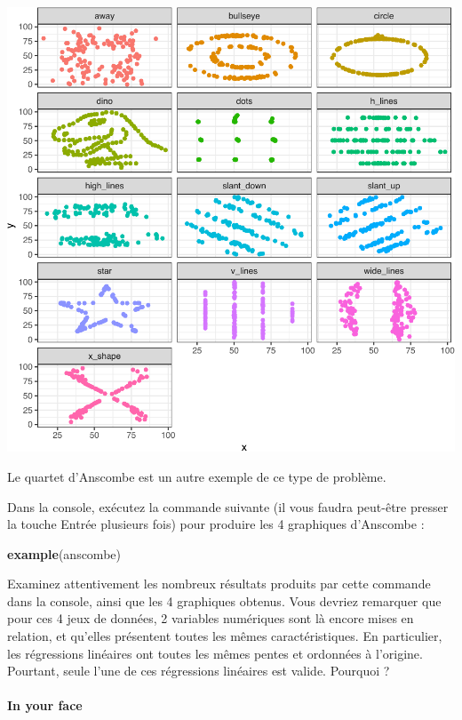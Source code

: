 \documentclass[
  a4paper,
]{article}
\newenvironment{Shaded}{\begin{snugshade}}{\end{snugshade}}
\newcommand{\KeywordTok}[1]{\textcolor[rgb]{0.12,0.11,0.11}{\textbf{#1}}}
\newcommand{\NormalTok}[1]{\textcolor[rgb]{0.12,0.11,0.11}{#1}}
\begin{document}
\begin{center}\includegraphics[width=0.9\linewidth]{figure/unnamed-chunk-125-1} \end{center}

Le quartet d'Anscombe est un autre exemple de ce type de problème.

Dans la console, exécutez la commande suivante (il vous faudra peut-être presser la touche Entrée plusieurs fois) pour produire les 4 graphiques d'Anscombe :

\begin{Shaded}
\begin{Highlighting}[]
\KeywordTok{example}\NormalTok{(anscombe)}
\end{Highlighting}
\end{Shaded}

Examinez attentivement les nombreux résultats produits par cette commande dans la console, ainsi que les 4 graphiques obtenus. Vous devriez remarquer que pour ces 4 jeux de données, 2 variables numériques sont là encore mises en relation, et qu'elles présentent toutes les mêmes caractéristiques. En particulier, les régressions linéaires ont toutes les mêmes pentes et ordonnées à l'origine. Pourtant, seule l'une de ces régressions linéaires est valide. Pourquoi ?

\hypertarget{in-your-face}{%
\paragraph{In your face}\label{in-your-face}}
\end{document}
